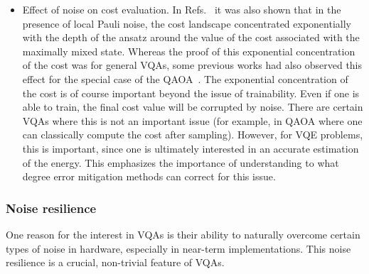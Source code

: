 \documentclass[prx,twocolumn,floatfix,superscriptaddress,longbibliography]{revtex4-1}
\newcommand{\<}{\langle}
\renewcommand{\>}{\rangle}
\begin{document}
\begin{itemize}
\item{Effect of noise on cost evaluation.}  In Refs.~\cite{wang2020noise,franca2020limitations} it was also shown that in the presence of local Pauli noise, the cost landscape concentrated exponentially with the depth of the ansatz around the value of the cost associated with the maximally mixed state. Whereas the proof of this exponential concentration of the cost was for general VQAs, some previous works had also observed this effect for the special case of the QAOA~\cite{xue2019effects,marshall2020characterizing}. The exponential concentration of the cost is of course important beyond the issue of trainability. Even if one is able to train, the final cost value will be corrupted by noise. There are certain VQAs where this is not an important issue (for example, in QAOA where one can classically compute the cost after sampling). However, for VQE problems, this is important, since one is ultimately interested in an accurate estimation of the energy. This emphasizes the importance of understanding to what degree error mitigation methods  can correct for this issue.
\end{itemize}   


\subsubsection{ Noise resilience} 

One reason for the interest in VQAs is their ability to naturally overcome certain types of noise in hardware, especially in near-term implementations. This noise resilience is a crucial, non-trivial feature of VQAs. 
\end{document}
